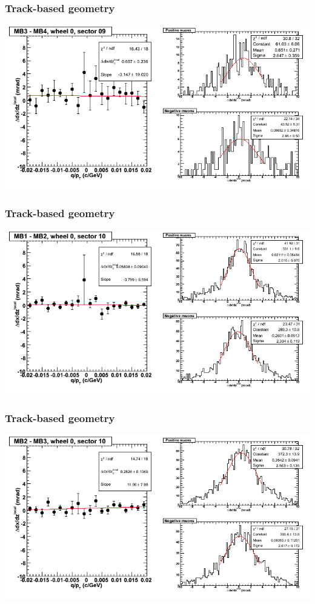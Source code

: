 \documentclass[compress]{beamer}
\begin{document}
\begin{frame}
\frametitle{Track-based geometry}
\includegraphics[width=\linewidth]{NOV4_segdiffs/dt13_slope_C_09_34.png}
\end{frame}

\begin{frame}
\frametitle{Track-based geometry}
\includegraphics[width=\linewidth]{NOV4_segdiffs/dt13_slope_C_10_12.png}
\end{frame}

\begin{frame}
\frametitle{Track-based geometry}
\includegraphics[width=\linewidth]{NOV4_segdiffs/dt13_slope_C_10_23.png}
\end{frame}
\end{document}
